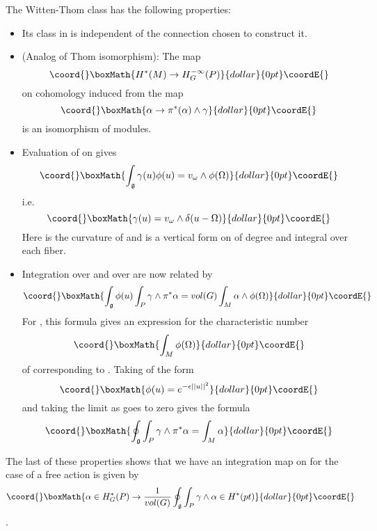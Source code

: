 \documentclass[a4paper,a4paper]{article}
\theoremstyle{conjecture}
\begin{document}
The Witten-Thom class has the following properties:
\begin{itemize}
\item
Its class in \coordHE{} is independent of the connection \myHighlight{$\omega$}\coordHE{} chosen to construct it.
\item
(Analog of Thom isomorphism): The map
$$\coord{}\boxMath{ H^*(M)\rightarrow H^{-\infty}_G(P)}{dollar}{0pt}\coordE{}$$
on cohomology induced from the map
$$\coord{}\boxMath{\alpha\rightarrow \pi^*(\alpha)\wedge\gamma}{dollar}{0pt}\coordE{}$$
is an isomorphism of \coordHE{} modules.
\item Evaluation of \myHighlight{$\gamma$}\coordHE{} on \coordHE{} gives
$$\coord{}\boxMath{\int_{\mathfrak g} \gamma (u)\phi(u)= v_\omega \wedge \phi(\Omega)}{dollar}{0pt}\coordE{}$$
i.e.
$$\coord{}\boxMath{\gamma(u)=v_\omega\wedge\delta(u-\Omega)}{dollar}{0pt}\coordE{}$$
Here \myHighlight{$\Omega$}\coordHE{} is the curvature of \myHighlight{$\omega$}\coordHE{} and \coordHE{} is a vertical form on
\coordHE{} of degree \coordHE{} and integral \coordHE{} over each fiber.
\item
Integration over \coordHE{} and over \coordHE{} are now related by
$$\coord{}\boxMath{\int_{\mathfrak g}\phi (u)\int_P \gamma\wedge\pi^*\alpha = vol(G)\int_M \alpha\wedge\phi(\Omega)}{dollar}{0pt}\coordE{}$$
For \coordHE{}, this formula gives an expression for the characteristic number 
$$\coord{}\boxMath{\int_M \phi(\Omega)}{dollar}{0pt}\coordE{}$$
of \coordHE{} corresponding
to \myHighlight{$\phi$}\coordHE{}.  Taking \myHighlight{$\phi$}\coordHE{} of the form
$$\coord{}\boxMath{\phi(u)=e^{-\epsilon ||u||^2}}{dollar}{0pt}\coordE{}$$
and taking the limit as \myHighlight{$\epsilon$}\coordHE{} goes to zero
gives the formula
$$\coord{}\boxMath{\oint_{\mathfrak g} \int_P \gamma\wedge\pi^*\alpha = \int_M \alpha}{dollar}{0pt}\coordE{}$$
\end{itemize}

The last of these properties shows that we have an integration map on \coordHE{} for the case of a free
action is given by 
$$\coord{}\boxMath{\alpha\in H^*_G(P) \rightarrow \frac{1}{vol(G)}\oint_{\mathfrak g}\int_P \gamma\wedge\alpha \in H^*(pt)}{dollar}{0pt}\coordE{}$$.
\end{document}
